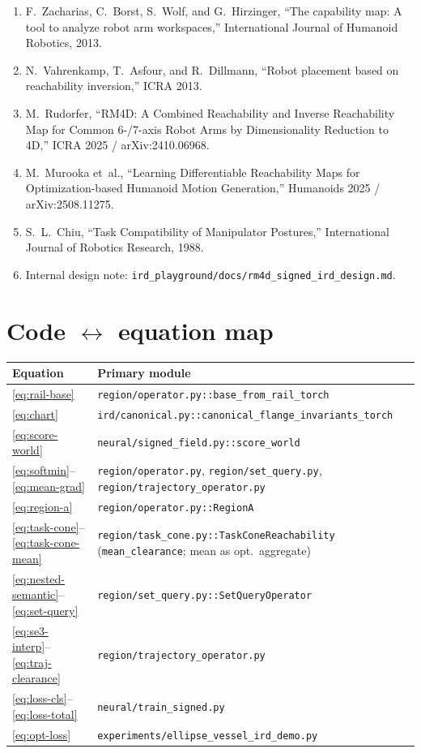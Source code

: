 \documentclass[11pt,a4paper]{article}
\begin{document}
\begin{enumerate}[leftmargin=1.6em]
  \item F.~Zacharias, C.~Borst, S.~Wolf, and G.~Hirzinger,
        ``The capability map: A tool to analyze robot arm workspaces,''
        International Journal of Humanoid Robotics, 2013.
  \item N.~Vahrenkamp, T.~Asfour, and R.~Dillmann,
        ``Robot placement based on reachability inversion,'' ICRA 2013.
  \item M.~Rudorfer,
        ``RM4D: A Combined Reachability and Inverse Reachability Map for
        Common 6-/7-axis Robot Arms by Dimensionality Reduction to 4D,''
        ICRA 2025 / arXiv:2410.06968.
  \item M.~Murooka et~al.,
        ``Learning Differentiable Reachability Maps for Optimization-based
        Humanoid Motion Generation,'' Humanoids 2025 / arXiv:2508.11275.
  \item S.~L.~Chiu,
        ``Task Compatibility of Manipulator Postures,''
        International Journal of Robotics Research, 1988.
  \item Internal design note:
        \texttt{ird\_playground/docs/rm4d\_signed\_ird\_design.md}.
\end{enumerate}

\appendix
\section{Code $\leftrightarrow$ equation map}
\label{sec:code-map}

\begin{center}
\begin{tabular}{@{}ll@{}}
\toprule
Equation & Primary module \\
\midrule
\eqref{eq:rail-base}
  & \texttt{region/operator.py::base\_from\_rail\_torch} \\
\eqref{eq:chart}
  & \texttt{ird/canonical.py::canonical\_flange\_invariants\_torch} \\
\eqref{eq:score-world}
  & \texttt{neural/signed\_field.py::score\_world} \\
\eqref{eq:softmin}--\eqref{eq:mean-grad}
  & \texttt{region/operator.py}, \texttt{region/set\_query.py},
    \texttt{region/trajectory\_operator.py} \\
\eqref{eq:region-a}
  & \texttt{region/operator.py::RegionA} \\
\eqref{eq:task-cone}--\eqref{eq:task-cone-mean}
  & \texttt{region/task\_cone.py::TaskConeReachability}
    (\texttt{mean\_clearance}; mean as opt.\ aggregate) \\
\eqref{eq:nested-semantic}--\eqref{eq:set-query}
  & \texttt{region/set\_query.py::SetQueryOperator} \\
\eqref{eq:se3-interp}--\eqref{eq:traj-clearance}
  & \texttt{region/trajectory\_operator.py} \\
\eqref{eq:loss-cls}--\eqref{eq:loss-total}
  & \texttt{neural/train\_signed.py} \\
\eqref{eq:opt-loss}
  & \texttt{experiments/ellipse\_vessel\_ird\_demo.py} \\
\bottomrule
\end{tabular}
\end{center}
\end{document}
